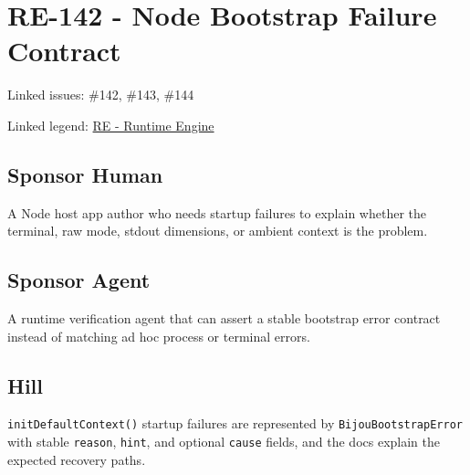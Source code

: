 \chapter{RE-142 - Node Bootstrap Failure Contract}\label{record-167}

\smallskip

Linked issues: \#142, \#143, \#144

Linked legend: \href{https://github.com/flyingrobots/bijou/blob/1853ad902f6bf219326409e7f743a5a1d6517dbc/docs/legends/RE-runtime-engine.md}{RE - Runtime Engine}

\section{Sponsor Human}\label{record-167-sponsor-human}

A Node host app author who needs startup failures to explain whether the terminal, raw mode, stdout dimensions, or ambient context is the problem.

\section{Sponsor Agent}\label{record-167-sponsor-agent}

A runtime verification agent that can assert a stable bootstrap error contract instead of matching ad hoc process or terminal errors.

\section{Hill}\label{record-167-hill}

\texttt{i\allowbreak{}n\allowbreak{}i\allowbreak{}t\allowbreak{}D\allowbreak{}e\allowbreak{}f\allowbreak{}a\allowbreak{}u\allowbreak{}l\allowbreak{}t\allowbreak{}C\allowbreak{}o\allowbreak{}n\allowbreak{}t\allowbreak{}e\allowbreak{}x\allowbreak{}t\allowbreak{}(\allowbreak{})} startup failures are represented by \texttt{B\allowbreak{}i\allowbreak{}j\allowbreak{}o\allowbreak{}u\allowbreak{}B\allowbreak{}o\allowbreak{}o\allowbreak{}t\allowbreak{}s\allowbreak{}t\allowbreak{}r\allowbreak{}a\allowbreak{}p\allowbreak{}E\allowbreak{}r\allowbreak{}r\allowbreak{}o\allowbreak{}r} with stable \texttt{r\allowbreak{}e\allowbreak{}a\allowbreak{}s\allowbreak{}o\allowbreak{}n}, \texttt{h\allowbreak{}i\allowbreak{}n\allowbreak{}t}, and optional \texttt{c\allowbreak{}a\allowbreak{}u\allowbreak{}s\allowbreak{}e} fields, and the docs explain the expected recovery paths.


